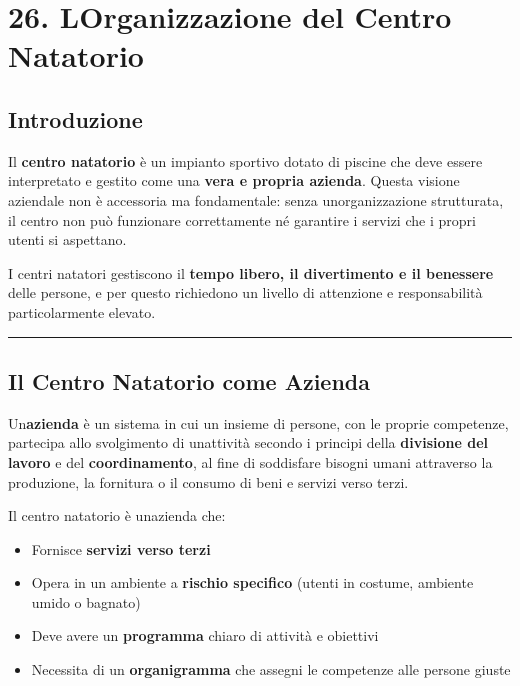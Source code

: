 \documentclass[a4paper,11pt]{article}
\providecommand{\tightlist}{%
  \setlength{\itemsep}{0pt}\setlength{\parskip}{0pt}}
\begin{document}
\section{26. L\textquotesingle Organizzazione del Centro
  Natatorio}\label{lorganizzazione-del-centro-natatorio}

\subsection{Introduzione}\label{introduzione-25}

Il \textbf{centro natatorio} è un impianto sportivo dotato di piscine
che deve essere interpretato e gestito come una \textbf{vera e propria
      azienda}. Questa visione aziendale non è accessoria ma fondamentale:
senza un\textquotesingle organizzazione strutturata, il centro non può
funzionare correttamente né garantire i servizi che i propri utenti si
aspettano.

I centri natatori gestiscono il \textbf{tempo libero, il divertimento e
      il benessere} delle persone, e per questo richiedono un livello di
attenzione e responsabilità particolarmente elevato.

\begin{center}\rule{0.5\linewidth}{0.5pt}\end{center}

\subsection{Il Centro Natatorio come
      Azienda}\label{il-centro-natatorio-come-azienda}

Un\textquotesingle{}\textbf{azienda} è un sistema in cui un insieme di
persone, con le proprie competenze, partecipa allo svolgimento di
un\textquotesingle attività secondo i principi della \textbf{divisione
      del lavoro} e del \textbf{coordinamento}, al fine di soddisfare bisogni
umani attraverso la produzione, la fornitura o il consumo di beni e
servizi verso terzi.

Il centro natatorio è un\textquotesingle azienda che:

\begin{itemize}
      \tightlist
      \item
            Fornisce \textbf{servizi verso terzi}
      \item
            Opera in un ambiente a \textbf{rischio specifico} (utenti in costume,
            ambiente umido o bagnato)
      \item
            Deve avere un \textbf{programma} chiaro di attività e obiettivi
      \item
            Necessita di un \textbf{organigramma} che assegni le competenze alle
            persone giuste
\end{itemize}
\end{document}
